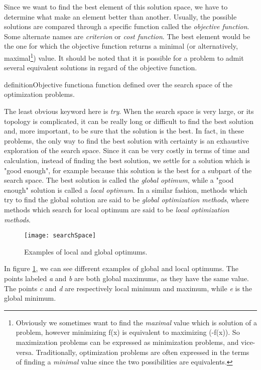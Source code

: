 Since we want to find the best element of this solution space, we have to determine what make an element better than another. Usually, the possible solutions are compared through a specific function called the \emph{objective function}. Some alternate names are \emph{criterion} or \emph{cost function}. The best element would be the one for which the objective function returns a minimal (or alternatively, maximal\footnote{Obviously we sometimes want to find the \emph{maximal} value which is solution of a problem, however minimizing f(x) is equivalent to maximizing (-f(x)). So maximization problems can be expressed as minimization problems, and vice-versa. Traditionally, optimization problems are often expressed in the terms of finding a \emph{minimal} value since the two possibilities are equivalents.}) value. It should be noted that it is possible for a problem to admit several equivalent solutions in regard of the objective function.

definition{Objective function}{a function defined over the search space of the optimization problems.}

The least obvious keyword here is \emph{try}. When the search space is very large, or its topology is complicated, it can be really long or difficult to find the best solution and, more important, to be sure that the solution is the best. In fact, in these problems, the only way to find the best solution with certainty is an exhaustive exploration of the search space. Since it can be very costly in terms
of time and calculation, instead of finding the best solution, we settle for a solution which is "good enough", for example because this solution is the best for a subpart of the search space. The best solution is called the \emph{global optimum}, while a "good enough" solution is called a \emph{local optimum}. In a similar fashion, methods which try to find the global solution are said to be \emph{global optimization methods}, where methods which search for local optimum are said to be \emph{local optimization methods}.


\begin{figure}
\centering
\texttt{[image: searchSpace]}
\caption{Examples of local and global optimums.}
\label{localAndGlobalOptims}
\end{figure}

In figure \ref{localAndGlobalOptims}, we can see different examples of global and local optimums. The points labeled \emph{a} and \emph{b} are both global maximums, as they have the same value. The points
\emph{c} and \emph{d} are respectively local minimum and maximum, while \emph{e} is the global minimum.

